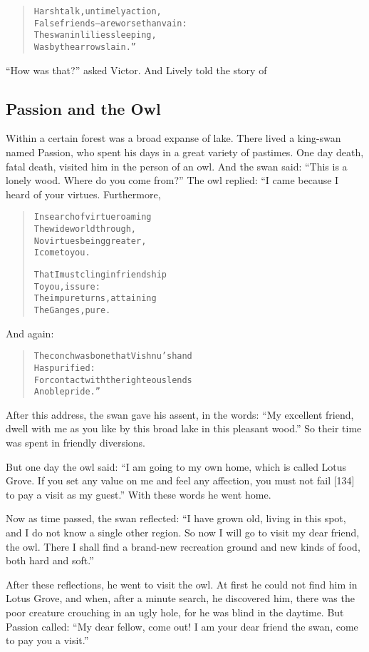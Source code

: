 \documentclass[article, twoside, 14pt]{memoir}
\renewenvironment{verbatim}{%
\begin{quote}%
\vskip -10pt%
\begin{alltt}\normalfont\large}{\end{alltt}%
\end{quote}%
\vskip -10pt
} %
\begin{document}
\begin{verbatim}
Harsh talk, untimely action,
    False friends--are worse than vain:
The swan in lilies sleeping,
    Was by the arrow slain.”
\end{verbatim}
``How was that?'' asked Victor. And Lively told the story of

\subsection{Passion and the Owl}

\label{s15}

Within a certain forest was a broad expanse of lake. There lived a
king-swan named Passion, who spent his days in a great variety of
pastimes. One day death, fatal death, visited him in the person of
an owl. And the swan said:
``This is a lonely wood. Where do you come from?'' The owl replied:
“I came because I heard of your virtues. Furthermore,

\begin{verbatim}
In search of virtue roaming
    The wide world through,
No virtues being greater,
    I come to you.

That I must cling in friendship
    To you, is sure:
The impure turns, attaining
    The Ganges, pure.
\end{verbatim}
And again:

\begin{verbatim}
The conch was bone that Vishnu's hand
    Has purified:
For contact with the righteous lends
    A noble pride.”
\end{verbatim}
After this address, the swan gave his assent, in the words:
``My excellent friend, dwell with me as you like by this broad lake in this pleasant wood.''
So their time was spent in friendly diversions.

But one day the owl said:
``I am going to my own home, which is called Lotus Grove. If you set any value on me and feel any affection, you must not fail [134] to pay a visit as my guest.''
With these words he went home.

Now as time passed, the swan reflected:
``I have grown old, living in this spot, and I do not know a single other region. So now I will go to visit my dear friend, the owl. There I shall find a brand-new recreation ground and new kinds of food, both hard and soft.''

After these reflections, he went to visit the owl. At first he
could not find him in Lotus Grove, and when, after a minute search,
he discovered him, there was the poor creature crouching in an ugly
hole, for he was blind in the daytime. But Passion called:
``My dear fellow, come out! I am your dear friend the swan, come to pay you a visit.''
\end{document}
